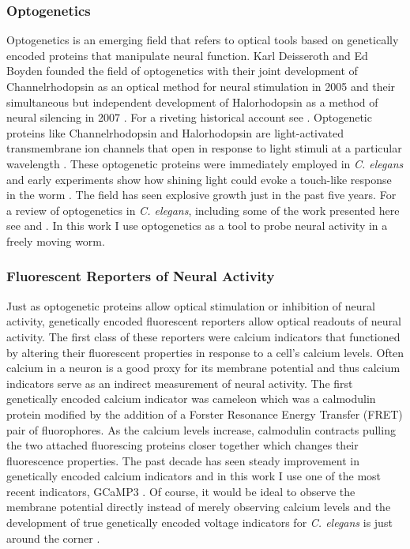  

\subsubsection{Optogenetics}
Optogenetics is an emerging field that refers to optical tools based on genetically encoded proteins that manipulate neural function. Karl Deisseroth and Ed Boyden founded the field of optogenetics with their joint development of Channelrhodopsin as an optical method for neural stimulation in  2005 \citep{boyden_millisecond-timescale_2005} and their simultaneous but independent development of Halorhodopsin as a method of neural silencing in 2007 \citep{zhang_multimodal_2007, han_multiple-color_2007}.  For a riveting historical account see \citep{boyden_history_2011}. Optogenetic proteins like Channelrhodopsin and Halorhodopsin are light-activated transmembrane ion channels that open in response to light stimuli at a particular wavelength \citep{nagel_channelrhodopsin-2_2003, yizhar_optogenetics_2011, fenno_development_2011}. These optogenetic proteins were immediately employed  in \textit{C. elegans} and early experiments show how shining light could evoke a touch-like response in the worm  \citep{nagel_light_2005}.  The field has seen explosive growth  just in the past five years. For a review of optogenetics in \textit{C. elegans}, including some of the work presented here see \citep{xu_early_2011} and \citep{yizhar_optogenetics_2011}. In this work I use optogenetics as a tool to probe neural activity in a freely moving worm. 

\subsubsection{Fluorescent Reporters of Neural Activity}
Just as optogenetic proteins allow optical stimulation or inhibition of neural activity,  genetically encoded fluorescent reporters allow optical readouts of neural activity. The first class of these reporters were calcium indicators that functioned by altering their fluorescent properties in response to a cell's calcium levels. Often calcium in a neuron is a good proxy for its membrane potential and thus calcium indicators serve as an indirect measurement of neural activity.   The first genetically encoded calcium indicator was cameleon \citep{miyawaki_fluorescent_1997} which was a calmodulin protein modified by the addition of a Forster Resonance Energy Transfer (FRET) pair of fluorophores. As the calcium levels increase, calmodulin contracts pulling the two attached fluorescing proteins closer together which changes their fluorescence properties. The past decade has seen  steady improvement in genetically encoded calcium indicators \citep{miyawaki_innovations_2005,mank_genetically_2008,yamada_quantitative_2011} and in this work I use one of the most recent indicators, GCaMP3 \citep{tian_imaging_2009}. Of course, it would be ideal to observe the membrane potential directly instead of merely observing calcium levels and the development of true genetically encoded voltage indicators for \textit{C. elegans} is just around the corner \citep{kralj_electrical_2011}. 

